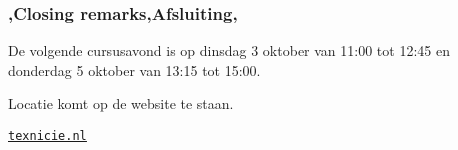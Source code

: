 \begin{frame}
    \frametitle{\lang,Closing remarks,Afsluiting,}
De volgende cursusavond is op dinsdag 3 oktober van 11:00 tot 12:45 en donderdag 5 oktober van 13:15 tot 15:00.

Locatie komt op de website te staan.

\bigskip

\leavevmode\bigskip

\begin{center}
    \centering \LARGE\href{https://texnicie.nl}{\ul{\texttt{texnicie.nl}}}
\end{center}
 \begin{center}
 \end{center}

\end{frame}
